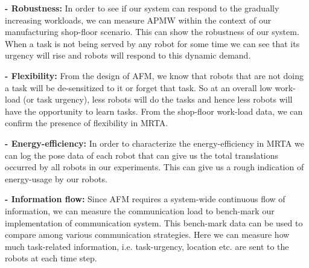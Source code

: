 \documentclass{intech}
\begin{document}
\textbf{- Robustness:} In order to see if our system can respond to the gradually increasing workloads,  we can measure APMW within the context of our manufacturing shop-floor scenario. This can show the robustness of our system. When a task is not being served by any robot for some time we can see that its urgency will rise and robots will respond to this dynamic demand. 

\textbf{- Flexibility:} From the design of AFM, we know that robots that are not doing a task will be de-sensitized to it or forget that task. So at an overall low work-load (or task urgency), less robots will do the tasks and hence less robots will have the opportunity to learn tasks. From the shop-floor work-load data, we can confirm the presence of flexibility in MRTA.

\textbf{- Energy-efficiency:} In order to characterize the energy-efficiency in MRTA we can log the pose data of each robot that can give us the total translations occurred by all robots in our experiments. This can give us a rough indication of energy-usage by our robots. 

\textbf{- Information flow:} Since AFM requires a system-wide continuous flow of information, we can measure the communication load to bench-mark our implementation of communication system. This bench-mark data can be used to compare among various communication strategies. Here we can measure  how much task-related information, i.e. task-urgency, location etc. are sent to the robots at each time step. %
\end{document}
